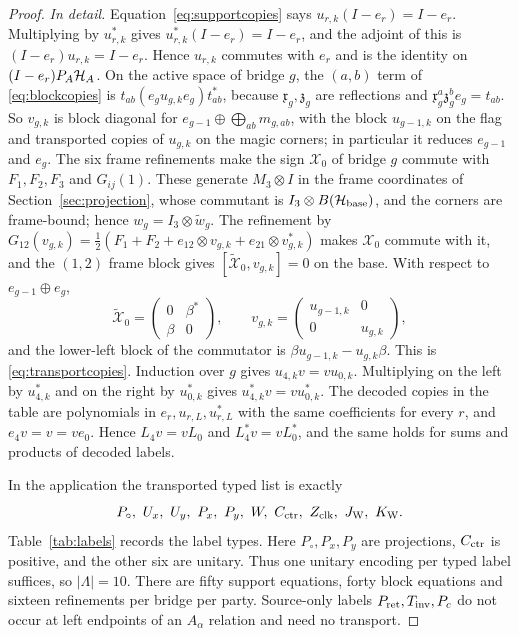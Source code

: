 \begin{proof}
\emph{In detail.} Equation~\eqref{eq:supportcopies} says $u_{r,k}(I-e_r)=I-e_r$. Multiplying by $u_{r,k}^*$ gives $u_{r,k}^*(I-e_r)=I-e_r$, and the adjoint of this is $(I-e_r)u_{r,k}=I-e_r$. Hence $u_{r,k}$ commutes with $e_r$ and is the identity on $(I-e_r)P_A\mathcal H_A$. On the active space of bridge $g$, the $(a,b)$ term of \eqref{eq:blockcopies} is $t_{ab}(e_gu_{g,k}e_g)t_{ab}^*$, because $\mathfrak x_g,\mathfrak z_g$ are reflections and $\mathfrak x_g^a\mathfrak z_g^be_g=t_{ab}$. So $v_{g,k}$ is block diagonal for $e_{g-1}\oplus\bigoplus_{ab}m_{g,ab}$, with the block $u_{g-1,k}$ on the flag and transported copies of $u_{g,k}$ on the magic corners; in particular it reduces $e_{g-1}$ and $e_g$. The six frame refinements make the sign $\mathcal X_0$ of bridge $g$ commute with $F_1,F_2,F_3$ and $G_{ij}(1)$. These generate $M_3\otimes I$ in the frame coordinates of Section~\ref{sec:projection}, whose commutant is $I_3\otimes B(\mathcal H_{\rm base})$, and the corners are frame-bound; hence $w_g=I_3\otimes\widetilde w_g$. The refinement by $G_{12}(v_{g,k})=\frac12(F_1+F_2+e_{12}\otimes v_{g,k}+e_{21}\otimes v_{g,k}^*)$ makes $\mathcal X_0$ commute with it, and the $(1,2)$ frame block gives $[\widetilde{\mathcal X}_0,v_{g,k}]=0$ on the base. With respect to $e_{g-1}\oplus e_g$,
\[
 \widetilde{\mathcal X}_0=\begin{pmatrix}0&\beta^*\\\beta&0\end{pmatrix},\qquad
 v_{g,k}=\begin{pmatrix}u_{g-1,k}&0\\0&u_{g,k}\end{pmatrix},
\]
and the lower-left block of the commutator is $\beta u_{g-1,k}-u_{g,k}\beta$. This is \eqref{eq:transportcopies}. Induction over $g$ gives $u_{4,k}v=vu_{0,k}$. Multiplying on the left by $u_{4,k}^*$ and on the right by $u_{0,k}^*$ gives $u_{4,k}^*v=vu_{0,k}^*$. The decoded copies in the table are polynomials in $e_r,u_{r,L},u_{r,L}^*$ with the same coefficients for every $r$, and $e_4v=v=ve_0$. Hence $L_4v=vL_0$ and $L_4^*v=vL_0^*$, and the same holds for sums and products of decoded labels.

In the application the transported typed list is exactly
\begin{equation}\label{eq:labelset}
 P_{\circ},\ U_x,\ U_y,\ P_x,\ P_y,\ W,\ C_{\rm ctr},\ Z_{\rm clk},\ J_{\rm W},\ K_{\rm W}.
\end{equation}
Table~\ref{tab:labels} records the label types. Here $P_{\circ},P_x,P_y$ are projections, $C_{\rm ctr}$ is positive, and the other six are unitary. Thus one unitary encoding per typed label suffices, so $|\Lambda|=10$. There are fifty support equations, forty block equations and sixteen refinements per bridge per party. Source-only labels $P_{\rm ret},T_{\rm inv},P_c$ do not occur at left endpoints of an $A_\alpha$ relation and need no transport.


\end{proof}
